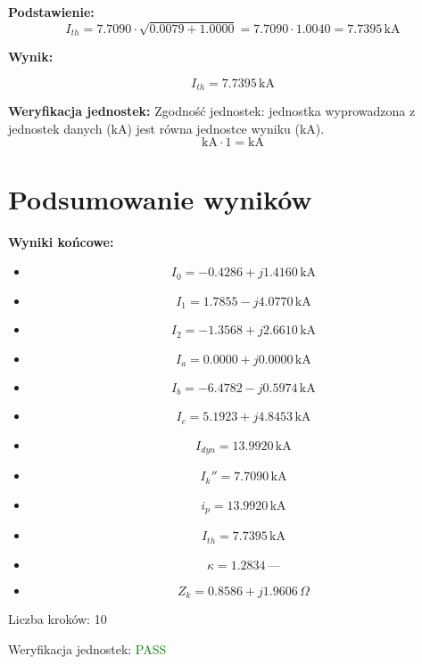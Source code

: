 \documentclass[11pt,a4paper]{article}
\begin{document}
\textbf{Podstawienie:}
$$
I_{th} = 7.7090 \cdot \sqrt{0.0079 + 1.0000} = 7.7090 \cdot 1.0040 = 7.7395\,\text{kA}
$$

\textbf{Wynik:}
\begin{center}
$$
I_{th} = 7.7395\,\mathrm{kA}
$$
\end{center}

\textbf{Weryfikacja jednostek:} Zgodność jednostek: jednostka wyprowadzona z jednostek danych (kA) jest równa jednostce wyniku (kA).
$$
\mathrm{kA} \cdot 1 = \mathrm{kA}
$$

\section{Podsumowanie wyników}

\textbf{Wyniki końcowe:}
\begin{itemize}
  \item
$$
I_0 = -0.4286 + j1.4160\,\mathrm{kA}
$$
  \item
$$
I_1 = 1.7855 - j4.0770\,\mathrm{kA}
$$
  \item
$$
I_2 = -1.3568 + j2.6610\,\mathrm{kA}
$$
  \item
$$
I_a = 0.0000 + j0.0000\,\mathrm{kA}
$$
  \item
$$
I_b = -6.4782 - j0.5974\,\mathrm{kA}
$$
  \item
$$
I_c = 5.1923 + j4.8453\,\mathrm{kA}
$$
  \item
$$
I_{dyn} = 13.9920\,\mathrm{kA}
$$
  \item
$$
I_k'' = 7.7090\,\mathrm{kA}
$$
  \item
$$
i_p = 13.9920\,\mathrm{kA}
$$
  \item
$$
I_{th} = 7.7395\,\mathrm{kA}
$$
  \item
$$
\kappa = 1.2834\,\text{—}
$$
  \item
$$
Z_k = 0.8586 + j1.9606\,\Omega
$$
\end{itemize}

Liczba kroków: 10

Weryfikacja jednostek: \textcolor{green}{PASS}
\end{document}
